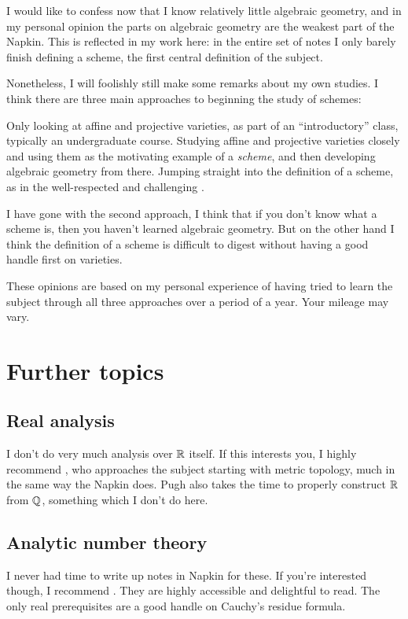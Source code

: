 I would like to confess now that I know relatively little algebraic geometry,
and in my personal opinion the parts on algebraic geometry
are the weakest part of the Napkin.
This is reflected in my work here:
in the entire set of notes I only barely finish defining a scheme,
the first central definition of the subject.

Nonetheless, I will foolishly still make some remarks about my own studies.
I think there are three main approaches to beginning the study of schemes:
\begin{itemize}
	\ii Only looking at affine and projective varieties,
	as part of an ``introductory'' class,
	typically an undergraduate course.
	\ii Studying affine and projective varieties closely
	and using them as the motivating example of a \emph{scheme},
	and then developing algebraic geometry from there.
	\ii Jumping straight into the definition of a scheme,
	as in the well-respected and challenging \cite{ref:vakil}.
\end{itemize}
I have gone with the second approach,
I think that if you don't know what a scheme is,
then you haven't learned algebraic geometry.
But on the other hand I think the definition of a scheme is
difficult to digest without having a good handle first on varieties.

These opinions are based on my personal experience of having
tried to learn the subject through all three approaches over a period of a year.
Your mileage may vary.

\section{Further topics}
\subsection*{Real analysis}
I don't do very much analysis over $\mathbb R$ itself.
If this interests you, I highly recommend \cite{ref:pugh},
who approaches the subject starting with metric topology,
much in the same way the Napkin does.
Pugh also takes the time to properly construct $\mathbb R$ from $\mathbb Q$,
something which I don't do here.

\subsection*{Analytic number theory}
I never had time to write up notes in Napkin for these.
If you're interested though, I recommend \cite{ref:analytic_NT}.
They are highly accessible and delightful to read.
The only real prerequisites are a good handle on Cauchy's residue formula.
